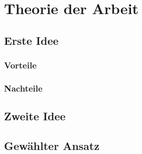 
\chapter{Theorie der Arbeit}\label{ch:theorie}

\blindtext[1]

\section{Erste Idee}\label{sec:ersteIdee}

\blindtext[1]
\blindenumerate{}
\blindtext[1]

\subsection{Vorteile}\label{ssec:Idee1vorteil}

\blindtext[2]

\subsection{Nachteile}\label{ssec:Idee1nachteil}

\blindtext[1]

\blindtext[1]

\section{Zweite Idee}\label{sec:zweiteIdee}

\blindtext[1]

\blindtext[1]

\section{Gewählter Ansatz}\label{sec:Ansatz}

\blindtext[1]



